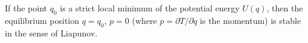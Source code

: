 If the point $q_0$ is a strict local minimum of the potential energy $U(q)$, then the equilibrium position $q = q_0$, $p = 0$ (where $p = \partial T / \partial \dot{q}$ is the momentum) is stable in the sense of Liapunov.
